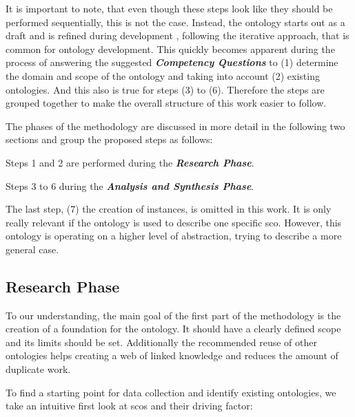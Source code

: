 \documentclass[a4paper, DIV=13, BCOR=0cm]{scrbook}
\newcommand{\pn}[1]{\textit{\textbf{#1}}}
\begin{document}
It is important to note, that even though these steps look like they should be performed sequentially, this is not the case. Instead, the ontology starts out as a draft and is refined during development \cite[Section 3, Introduction]{guide-to-ontology}, following the iterative approach, that is common for ontology development. \cite[p.\,158, section 1.5.1]{stuckenschmidt2010ontologien} This quickly becomes apparent during the process of answering the suggested \pn{Competency Questions} to (1) determine the domain and scope of the ontology \cite[Section 3, Step 1]{guide-to-ontology} and taking into account (2) existing ontologies. And this also is true for steps (3) to (6). Therefore the steps are grouped together to make the overall structure of this work easier to follow.

The phases of the methodology are discussed in more detail in the following two sections and group the proposed steps as follows:

\begin{compactenum}
	\item Steps 1 and 2 are performed during the \pn{Research Phase}.
	\item Steps 3 to 6 during the \pn{Analysis and Synthesis Phase}.
\end{compactenum}

The last step, (7) the creation of instances, is omitted in this work. It is only really relevant if the ontology is used to describe one specific \gls{sco}. \cite{CN} However, this ontology is operating on a higher level of abstraction, trying to describe a more general case.

\subsection{Research Phase }
To our understanding, the main goal of the first part of the methodology is the creation of a foundation for the ontology. It should have a clearly defined scope and its limits should be set. Additionally the recommended reuse of other ontologies helps creating a web of linked knowledge and reduces the amount of duplicate work.

To find a starting point for data collection and identify existing ontologies, we take an intuitive first look at \glspl{sco} and their driving factor:
\end{document}
